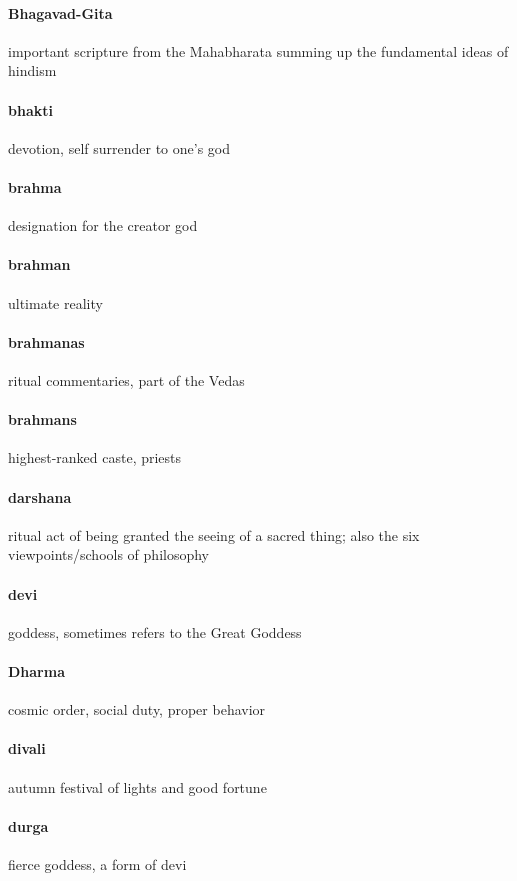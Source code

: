 \documentclass{article}
\begin{document}
\paragraph{Bhagavad-Gita}
\label{par:bhagavad_gita}
important scripture from the Mahabharata summing up the fundamental ideas of hindism
\paragraph{bhakti}
\label{par:bhakti}
devotion, self surrender to one's god
\paragraph{brahma}
\label{par:brahma}
designation for the creator god
\paragraph{brahman}
\label{par:brahman}
ultimate reality
\paragraph{brahmanas}
\label{par:brahmanas}
ritual commentaries, part of the Vedas
\paragraph{brahmans}
\label{par:brahmans}
highest-ranked caste, priests
\paragraph{darshana}
\label{par:darshana}
ritual act of being granted the seeing of a sacred thing; also the six viewpoints/schools of philosophy
\paragraph{devi}
\label{par:devi}
goddess, sometimes refers to the Great Goddess
\paragraph{Dharma}
\label{par:dharma}
cosmic order, social duty, proper behavior
\paragraph{divali}
\label{par:divali}
autumn festival of lights and good fortune
\paragraph{durga}
\label{par:durga}
fierce goddess, a form of devi
\end{document}
